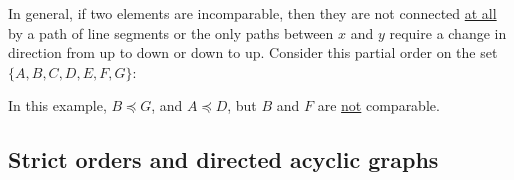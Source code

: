 In general, if two elements are incomparable, then they are not connected \underline{at all} by a path of line segments
or the only paths between $x$ and $y$ require a change in direction from up to down or down to up.
Consider this partial order on the set $\{A,B,C,D,E,F,G\}$:
\begin{center}
\end{center}
In this example, $B \preceq G$, and $A \preceq D$, but $B$ and $F$ are \underline{not} comparable.

\subsection{Strict orders and directed acyclic graphs}

